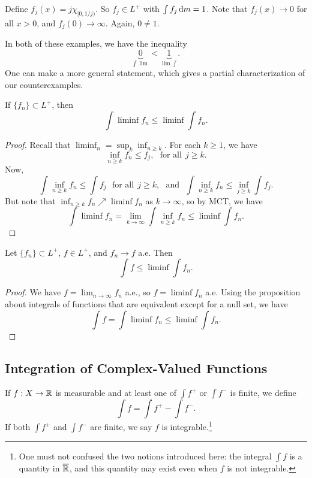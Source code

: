 \documentclass[12pt]{article} %
\begin{document}
\begin{example}
    Define $f_j(x) = j \chi_{[0, 1/j)}$. So $f_j \in L^+$ with $\int f_j \, \mathrm{d} m = 1$. Note that $f_j(x) \to 0$ for all $x > 0$, and $f_j(0) \to \infty$. Again, $0 \neq 1$.
\end{example}

\noindent In both of these examples, we have the inequality \[\underbrace{0}_{\int \lim} < \underbrace{1}_{\lim \int}.\] One can make a more general statement, which gives a partial characterization of our counterexamples.

\begin{lemma}[Fatou]
    If $\{f_n\} \subset L^+$, then \[\int \liminf f_n \leq \liminf \int f_n.\]
\end{lemma}

\begin{proof}
    Recall that $\liminf_n = \sup_k \inf_{n \geq k}$. For each $k \geq 1$, we have \[\inf_{n \geq k} f_n \leq f_j, \ \ \ \text{for all} \ \ j \geq k.\] Now, \[\int \inf_{n \geq k} f_n \leq \int f_j \ \ \ \text{for all} \ \ j \geq k, \ \ \ \text{and} \ \ \ \int \inf_{n \geq k} f_n \leq \inf_{j \geq k} \int f_j.\] But note that $\inf_{n \geq k} f_n \nearrow \liminf f_n$ as $k \to \infty$, so by MCT, we have \[\int \liminf f_n = \lim_{k \to \infty} \int \inf_{n \geq k} f_n \leq \liminf \int f_n.\]
\end{proof}

\begin{corollary}
    Let $\{f_n\} \subset L^+$, $f \in L^+$, and $f_n \to f$ a.e. Then \[\int f \leq \liminf \int f_n.\]
\end{corollary}

\begin{proof}
    We have $f = \lim_{n \to \infty} f_n$ a.e., so $f = \liminf f_n$ a.e. Using the proposition about integrals of functions that are equivalent except for a null set, we have \[\int f = \int \liminf f_n \leq \liminf \int f_n.\]
\end{proof}

\subsection{Integration of Complex-Valued Functions}

\begin{definition}
    If $f : X \to \mathbb{R}$ is measurable and at least one of $\int f^+$ or $\int f^-$ is finite, we define \[\int f = \int f^+ - \int f^-.\] If both $\int f^+$ and $\int f^-$ are finite, we say $f$ is integrable.\footnote{One must not confused the two notions introduced here: the integral $\int f$ is a quantity in $\overline{\mathbb{R}}$, and this quantity may exist even when $f$ is not integrable.}
\end{definition}
\end{document}
